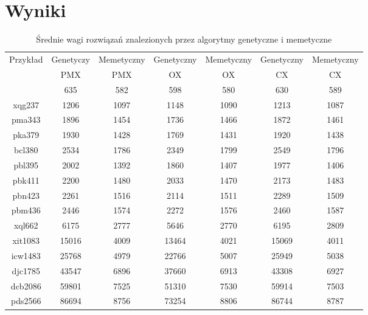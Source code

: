 \documentclass{article}
\begin{document}
\section{Wyniki}
\begin{table}[h!]
    \centering
    \begin{tabular}{|c|c|c|c|c|c|c|}
        \hline
        \multirow{3}{*}{Przykład} & Genetyczy & Memetyczny & Genetyczny & Memetyczny  & Genetyczny & Memetyczny  \\
        & PMX  & PMX & OX & OX & CX & CX \\
        \hline
        xqf131 & 635 & 582 & 598 & 580 & 630 & 589 \\
        \hline
        xqg237 & 1206 & 1097 & 1148 & 1090 & 1213 & 1087 \\
        \hline
        pma343 & 1896 & 1454 & 1736 & 1466 & 1872 & 1461 \\
        \hline
        pka379 & 1930 & 1428 & 1769 & 1431 & 1920 & 1438 \\
        \hline
        bcl380 & 2534 & 1786 & 2349 & 1799 & 2549 & 1796 \\
        \hline
        pbl395 & 2002 & 1392 & 1860 & 1407 & 1977 & 1406 \\
        \hline
        pbk411 & 2200 & 1480 & 2033 & 1470 & 2173 & 1483 \\
        \hline
        pbn423 & 2261 & 1516 & 2114 & 1511 & 2289 & 1509 \\
        \hline
        pbm436 & 2446 & 1574 & 2272 & 1576 & 2460 & 1587 \\
        \hline
        xql662 & 6175 & 2777 & 5646 & 2770 & 6195 & 2809 \\
        \hline
        xit1083 & 15016 & 4009 & 13464 & 4021 & 15069 & 4011\\
        \hline
        icw1483 & 25768 & 4979 & 22766 & 5007 & 25949 & 5038 \\
        \hline
        djc1785 & 43547 & 6896 & 37660 & 6913 & 43308 & 6927 \\
        \hline
        dcb2086 & 59801 & 7525 & 51310 & 7530 & 59914 & 7503 \\
        \hline
        pds2566 & 86694 & 8756 & 73254 & 8806 & 86744 & 8787 \\
        \hline
    \end{tabular}
    \caption{Średnie wagi rozwiązań znalezionych przez algorytmy genetyczne i memetyczne}
\end{table}
\end{document}
